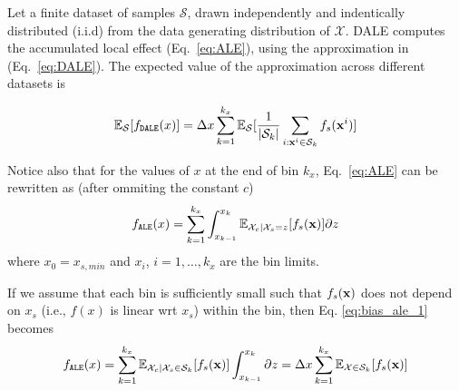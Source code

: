 Let a finite dataset of samples \(\mathcal{S}\), drawn independently
and indentically distributed (i.i.d) from the data generating
distribution of \(\mathcal{X}\). DALE computes the accumulated local
effect (Eq.~\eqref{eq:ALE}), using the approximation in
(Eq.~\eqref{eq:DALE}). The expected value of the approximation across
different datasets is

\begin{equation}
  \mathbb{E}_{\mathcal{S}}[f_{\mathtt{DALE}}(x)] =
  \Delta x\sum_{k=1}^{k_x}\mathbb{E}_{\mathcal{S}}[\frac{1}{|\mathcal{S}_k|}\sum_{i:\mathbf{x}^i \in
      \mathcal{S}_k} f_s(\mathbf{x}^i)]
  \label{eq:bias_dale}
\end{equation}

\noindent
Notice also that for the values of \(x\) at the end of bin \(k_x\),
Eq.~\eqref{eq:ALE} can be rewritten as (after ommiting the constant
\(c\))
\begin{equation}
  f_{\mathtt{ALE}}(x) = \sum_{k = 1}^{k_x}\int_{x_{k-1}}^{x_k}
    \mathbb{E}_{\mathcal{X}_c|\mathcal{X}_s=z}[f_s(\mathbf{x})] \partial z
    \label{eq:bias_ale_1}
\end{equation}
where \(x_0=x_{s, min}\) and \(x_i\), \(i=1, \dotsc, k_x\) are the bin limits.

\noindent
If we assume that each bin is sufficiently small such that \(f_s(\mathbf{x})\) does
not depend on \(x_s\) (i.e., \(f(x)\) is linear wrt \(x_s\)) within the bin, then
Eq. \eqref{eq:bias_ale_1} becomes
\begin{equation}
  f_{\mathtt{ALE}}(x) = \sum_{k = 1}^{k_x}\mathbb{E}_{\mathcal{X}_c|\mathcal{X}_s \in
    \mathcal{S}_k}[f_s(\mathbf{x})]\int_{x_{k-1}}^{x_k} \partial z 
  = \Delta x\sum_{k=1}^{k_x}\mathbb{E}_{\mathcal{X} \in \mathcal{S}_k}[f_s(\mathbf{x})]
    \label{eq:bias_ale_2}
\end{equation}

